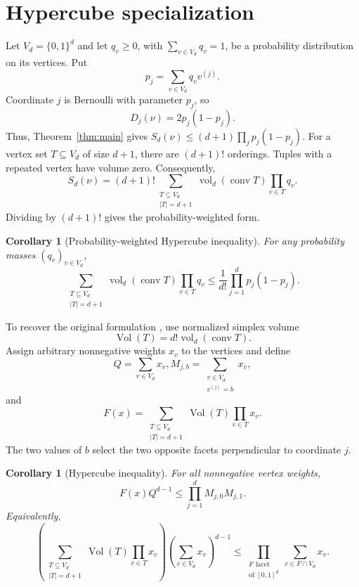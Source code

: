 \documentclass[11pt]{article}
\newtheorem{corollary}[theorem]{Corollary}
\theoremstyle{remark}
\newcommand{\vol}{\operatorname{vol}}
\newcommand{\nvol}{\operatorname{Vol}}
\newcommand{\conv}{\operatorname{conv}}
\begin{document}
\section{Hypercube specialization}
\label{sec:cube}
\begin{aiblock}




Let $V_d=\{0,1\}^d$ and let $q_v\geq0$, with $\sum_{v\in V_d}q_v=1$,
be a probability distribution on its vertices. Put
$$p_j=\sum_{v\in V_d}q_vv^{(j)}.$$
Coordinate $j$ is Bernoulli with parameter $p_j$, so
\begin{equation}
D_j(\nu)=2p_j(1-p_j).
\end{equation}
Thus, Theorem~\ref{thm:main} gives
$S_d(\nu)\leq(d+1)\prod_jp_j(1-p_j)$.
For a vertex set $T\subseteq V_d$ of size $d+1$, there are $(d+1)!$
orderings. Tuples with a repeated vertex have volume zero. Consequently,
\begin{equation}
S_d(\nu)=(d+1)!\sum_{\substack{T\subseteq V_d\\|T|=d+1}}\vol_d(\conv T)\prod_{v\in T}q_v.
\end{equation}
Dividing by $(d+1)!$ gives the probability-weighted form.

\begin{corollary}[Probability-weighted Hypercube inequality]
\label{cor:cube}
For any probability masses $(q_v)_{v\in V_d}$,
\begin{equation}
\sum_{\substack{T\subseteq V_d\\|T|=d+1}}\vol_d(\conv T)\prod_{v\in T}q_v
\leq\frac1{d!}\prod_{j=1}^dp_j(1-p_j).
\end{equation}
\end{corollary}

To recover the original formulation \cite[Eq.~(3)]{AVS}, use normalized
simplex volume
$$\nvol(T)=d!\vol_d(\conv T).$$
Assign arbitrary nonnegative weights $x_v$ to the vertices and define
$$Q=\sum_{v\in V_d}x_v, M_{j,b}=\sum_{\substack{v\in V_d\\v^{(j)}=b}}x_v,$$
and
$$F(x)=\sum_{\substack{T\subseteq V_d\\|T|=d+1}}\nvol(T)\prod_{v\in T}x_v.$$
The two values of $b$ select the two opposite facets perpendicular to
 coordinate $j$.

\begin{corollary}[Hypercube inequality]
\label{cor:weighted-cube}
For all nonnegative vertex weights,
$$F(x)Q^{d-1}\leq\prod_{j=1}^dM_{j,0}M_{j,1}.$$
Equivalently,
$$\left(\sum_{\substack{T\subseteq V_d\\|T|=d+1}}\nvol(T)\prod_{v\in T}x_v\right)
\left(\sum_{v\in V_d}x_v\right)^{d-1}
\leq\prod_{\substack{F\text{ facet}\\\text{of }[0,1]^d}}\sum_{v\in F\cap V_d}x_v.$$
\end{corollary}


\end{aiblock}
\end{document}
